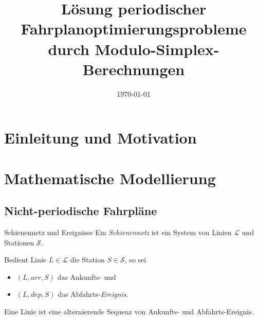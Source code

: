 \documentclass[accentcolor = tud11b, colorbacktitle, landscape, german, presentation, tudmathserif]{tudbeamer}
\title{Lösung periodischer Fahrplanoptimierungsprobleme durch Modulo-Simplex-Berechnungen}
\institute{Fabian Damken}
\date{\today}
\newcommand{\arr}{\mathit{arr}}
\newcommand{\dep}{\mathit{dep}}
\begin{document}
	
	
	\begin{titleframe}
	\end{titleframe}

	\section{Einleitung und Motivation}
	
	\section{Mathematische Modellierung}
		\subsection{Nicht-periodische Fahrpläne}
			\begin{frame}{Schienennetz und Ereignisse}
				Ein \emph{Schienennetz} ist ein System von Linien \(\mathcal{L}\) und Stationen \(\mathcal{S}\).
			
				\vspace{1cm}
				Bedient Linie \( L \in \mathcal{L} \) die Station \( S \in \mathcal{S} \), so sei
				\begin{itemize}
					\item \( (L, \arr, S) \) \tabto{1.7cm} das Ankunfts- und
					\item \( (L, \dep, S) \) \tabto{1.7cm} das Abfahrts-\emph{Ereignis}.
				\end{itemize}
			
				Eine Linie ist eine alternierende Sequenz von Ankunfts- und Abfahrts-Ereignis.
			\end{frame}
		
\end{document}
